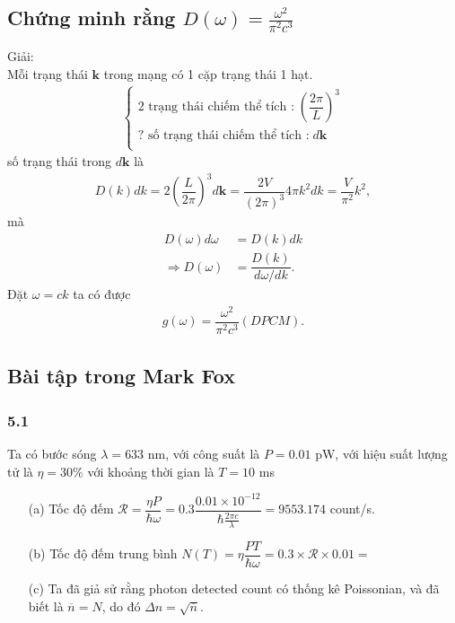 \documentclass{report}
\newcommand{\f}[2]{\dfrac{#1}{#2}}
\begin{document}
\subsection*{Chứng minh rằng $D(\omega) = \frac{\omega^2}{\pi^2 c^3}$}
Giải:\\
Mỗi trạng thái $\mathbf{k}$ trong mạng có 1 cặp trạng thái 1 hạt.
\begin{align*}
	\begin{cases}
		\text{2 trạng thái chiếm thể tích :} \; \left(\f{2\pi}{L}\right)^3 \\
		\text{? số trạng thái chiếm thể tích :} \; d\mathbf{k}             \\
	\end{cases}
\end{align*}
số trạng thái trong $d\mathbf{k}$ là
\begin{align*}
	D(k)dk = 2  \left(\f{L}{2\pi}\right)^3 d\mathbf{k} = \f{2V}{(2\pi)^3} 4\pi k^2 dk = \f{V}{\pi^2}k^2,
\end{align*}
mà
\begin{align*}
	D(\omega) d\omega     & = D(k) dk                 \\
	\Rightarrow D(\omega) & = \f{D(k)}{d\omega / dk}.
\end{align*}
Đặt $\omega = ck$ ta có được
\begin{align*}
	g(\omega) = \f{\omega^2}{\pi^2 c^3} (DPCM).
\end{align*}

\subsection*{Bài tập trong Mark Fox}
\subsubsection*{5.1}
Ta có bước sóng $\lambda = 633$ nm, với công suất là $P = 0.01$ pW, với hiệu suất lượng tử là $\eta = 30\% $ với khoảng thời gian là $T = 10$ ms
\begin{enumerate}
	\item[(a)] Tốc độ đếm $\mathcal{R} = \f{\eta P}{\hbar \omega} = 0.3 \f{0.01 \times 10^{-12}}{\hbar \frac{2\pi c}{\lambda}} = 9553.174$ count/s.
	\item[(b)] Tốc độ đếm trung bình $N(T)= \eta \f{PT}{\hbar \omega} = 0.3 \times \mathcal{R}\times 0.01 =$
	\item[(c)] Ta đã giả sử rằng photon detected count có thống kê Poissonian, và đã biết là $\overline{n} = N$, do đó $\Delta n = \sqrt{\overline{n}}$.
\end{enumerate}
\end{document}
